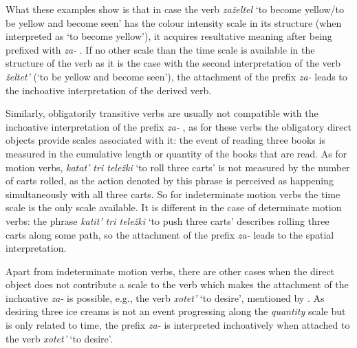 What these examples show is that in case the verb \textit{za\v{z}eltel} `to become yellow/to be yellow and become seen' has the colour intensity scale in its structure (when interpreted as `to become yellow'), it acquires resultative  meaning after being prefixed with \textit{za-}  . If no other scale than the time scale is available in the structure of the verb as it is the case with the second interpretation of the verb \textit{\v{z}eltet'} (`to be yellow and become seen'), the attachment of the prefix \textit{za-}   leads to the inchoative  interpretation of the derived verb.

Similarly, obligatorily transitive verbs  are usually not compatible with the inchoative  interpretation of the prefix \textit{za-}  , as for these verbs the obligatory direct objects provide scales associated with it: the event of reading three books is measured in the cumulative  length or quantity of the books that are read. As for motion verbs, \textit{katat' tri tele\v{z}ki} `to roll three carts' is not measured by the number of carts rolled, as the action denoted by this phrase is perceived as happening simultaneously with all three carts. So for indeterminate motion verbs the time scale is the only scale available. It is different in the case of determinate motion verbs: the phrase \textit{katit' tri tele\v{z}ki} `to push three carts' describes rolling three carts along some path, so the attachment of the prefix \textit{za-}   leads to the spatial  interpretation.

Apart from indeterminate motion verbs, there are other cases when the direct object does not contribute a scale to the verb which makes the attachment of the inchoative  \textit{za-}   is possible, e.g., the verb \textit{xotet'} `to desire', mentioned by \citet{Braginsky:08}. As desiring three ice creams is not an event progressing along the \textit{quantity} scale but is only related to time, the prefix \textit{za-}   is interpreted inchoatively  when attached to the verb \textit{xotet'} `to desire'.

